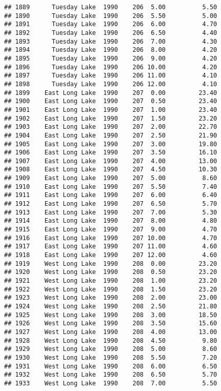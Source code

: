 \documentclass[
]{article}
\begin{document}
\begin{verbatim}
## 1889      Tuesday Lake  1990    206  5.00          5.50
## 1890      Tuesday Lake  1990    206  5.50          5.00
## 1891      Tuesday Lake  1990    206  6.00          4.70
## 1892      Tuesday Lake  1990    206  6.50          4.40
## 1893      Tuesday Lake  1990    206  7.00          4.30
## 1894      Tuesday Lake  1990    206  8.00          4.20
## 1895      Tuesday Lake  1990    206  9.00          4.20
## 1896      Tuesday Lake  1990    206 10.00          4.20
## 1897      Tuesday Lake  1990    206 11.00          4.10
## 1898      Tuesday Lake  1990    206 12.00          4.10
## 1899    East Long Lake  1990    207  0.00         23.40
## 1900    East Long Lake  1990    207  0.50         23.40
## 1901    East Long Lake  1990    207  1.00         23.40
## 1902    East Long Lake  1990    207  1.50         23.20
## 1903    East Long Lake  1990    207  2.00         22.70
## 1904    East Long Lake  1990    207  2.50         21.90
## 1905    East Long Lake  1990    207  3.00         19.80
## 1906    East Long Lake  1990    207  3.50         16.10
## 1907    East Long Lake  1990    207  4.00         13.00
## 1908    East Long Lake  1990    207  4.50         10.30
## 1909    East Long Lake  1990    207  5.00          8.60
## 1910    East Long Lake  1990    207  5.50          7.40
## 1911    East Long Lake  1990    207  6.00          6.40
## 1912    East Long Lake  1990    207  6.50          5.70
## 1913    East Long Lake  1990    207  7.00          5.30
## 1914    East Long Lake  1990    207  8.00          4.80
## 1915    East Long Lake  1990    207  9.00          4.70
## 1916    East Long Lake  1990    207 10.00          4.70
## 1917    East Long Lake  1990    207 11.00          4.60
## 1918    East Long Lake  1990    207 12.00          4.60
## 1919    West Long Lake  1990    208  0.00         23.20
## 1920    West Long Lake  1990    208  0.50         23.20
## 1921    West Long Lake  1990    208  1.00         23.20
## 1922    West Long Lake  1990    208  1.50         23.20
## 1923    West Long Lake  1990    208  2.00         23.00
## 1924    West Long Lake  1990    208  2.50         21.80
## 1925    West Long Lake  1990    208  3.00         18.50
## 1926    West Long Lake  1990    208  3.50         15.60
## 1927    West Long Lake  1990    208  4.00         13.00
## 1928    West Long Lake  1990    208  4.50          9.80
## 1929    West Long Lake  1990    208  5.00          8.60
## 1930    West Long Lake  1990    208  5.50          7.20
## 1931    West Long Lake  1990    208  6.00          6.50
## 1932    West Long Lake  1990    208  6.50          5.70
## 1933    West Long Lake  1990    208  7.00          5.50

\end{verbatim}
\end{document}
